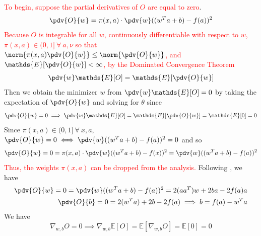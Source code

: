         \textcolor{red}{To begin, suppose the partial derivatives of $O$ are equal to zero}.
        \begin{equation*}
            \pdv{O}{w}=\pi(x,a)\cdot \pdv{w}((w^Ta+b)-f(a))^2
        \end{equation*}
        \textcolor{red}{Because $O$ is integrable for all $w$, continuously differentiable with respect to $w$, $\pi(x,a) \in (0,1]\ \forall\ a,\nu$ so that $\norm{\pi(x,a)\pdv{O}{w}}\leq\norm{\pdv{O}{w}}$, and $\mathds{E}[\pdv{O}{w}]<\infty$, by the Dominated Convergence Theorem}
        \begin{equation*}
            \pdv{w}\mathds{E}[O] = \mathds{E}[\pdv{O}{w}]
        \end{equation*}
        Then we obtain the minimizer $w$ from $\pdv{w}\mathds{E}[O]=0$ by taking the expectation of $\pdv{O}{w}$ and solving for $\theta$ since 
        \begin{equation*}
            \pdv{O}{w} = 0 \implies \pdv{w}\mathds{E}[O] = \mathds{E}[\pdv{O}{w}] = \mathds{E}[0] = 0 
        \end{equation*}
        Since $\pi(x,a)\in(0,1]\ \forall\ x,a$, $\pdv{O}{w} = 0 \iff \pdv{w}((w^Ta+b)-f(a))^2=0$ and so
        \begin{equation*}
            \pdv{O}{w} = 0 = \pi(x,a)\cdot \pdv{w}((w^Ta+b)-f(x))^2 = \pdv{w}((w^Ta+b)-f(a))^2
        \end{equation*}
        \textcolor{red}{Thus, the weights $\pi(x,a)$ can be dropped from the analysis.} Following \citep{agarwal21clime}, we have 
        \begin{align*}
            \pdv{O}{w} = 0 = \pdv{w}((w^Ta+b)-f(a))^2 = 2(aa^T)w + 2ba - 2f(a)a \\
            \pdv{O}{b} = 0 = 2(w^Ta) + 2b - 2f(a) \implies b = f(a) - w^Ta
        \end{align*}
        We have 
        \begin{equation*}
            \nabla_{w,b} O = 0 \implies \nabla_{w,b} \mathds{E}[O] = \mathds{E}[\nabla_{w,b}O] = \mathds{E}[0]=0
        \end{equation*}
